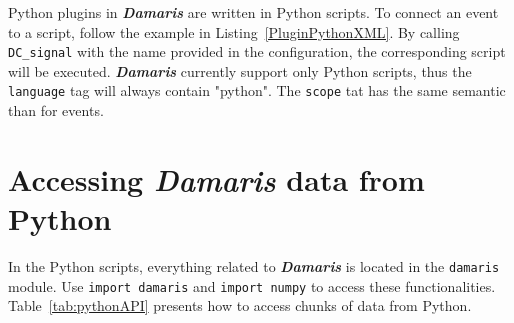 \documentclass[11pt]{report}
\newcommand{\Damaris}{\emph{\textbf{Damaris}}}
\newcommand{\function}[1]{\texttt{#1}}
\begin{document}
Python plugins in \Damaris{} are written in Python scripts. To connect an event to
a script, follow the example in Listing~\ref{PluginPythonXML}. By calling \function{DC\_signal}
with the name provided in the configuration, the corresponding script will be executed.
\Damaris{} currently support only Python scripts, thus the \texttt{language} tag will always contain
"python". The \texttt{scope} tat has the same semantic than for events.

\noindent\begin{minipage}{\textwidth}
\vspace{0.5cm}

\end{minipage}

\section{Accessing \Damaris{} data from Python}

In the Python scripts, everything related to \Damaris{} is located in the \texttt{damaris} module. 
Use \texttt{import damaris} and \texttt{import numpy} to access these functionalities.
Table~\ref{tab:pythonAPI} presents how to access chunks of data from Python.
\end{document}
